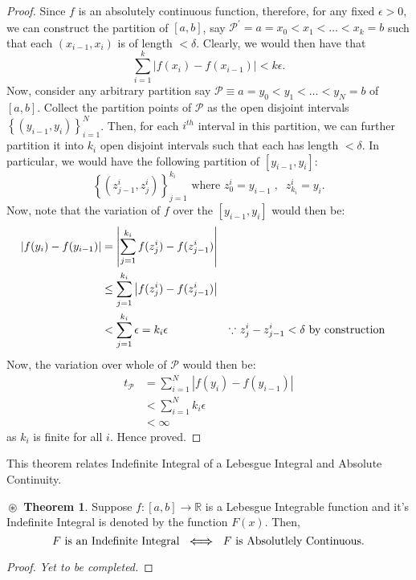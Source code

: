 \documentclass{article}
\theoremstyle{definition}
\newtheorem{theorem}{$\boxed{\boxed{\circledast}}$ Theorem}
\theoremstyle{remark}
\theoremstyle{definition}
\theoremstyle{definition}
\theoremstyle{definition}
\newcommand{\abs}[1]{\left \vert #1\right \vert}
\newcommand{\R}{\mathbb{R}}
\begin{document}
\begin{proof}
	 Since $ f $ is an absolutely continuous function, therefore, for any fixed $ \epsilon > 0 $, we can construct the partition of $ [a,b] $, say $ \mathcal{P}^{\prime} = a = x_0 < x_1 <\dots< x_k = b$ such that each $ (x_{i-1},x_i) $ is of length $ < \delta $. Clearly, we would then have that
	 \[\sum_{i=1}^{k}\abs{f(x_i) - f(x_{i-1})} < k\epsilon.\]
	 Now, consider any arbitrary partition say $ \mathcal{P} \equiv a = y_0 < y_1 < \dots< y_N = b $ of $ [a,b] $. Collect the partition points of $ \mathcal{P} $ as the open disjoint intervals $ \left \{(y_{i-1}, y_i)\right \}_{i=1}^{N}$. Then, for each $ i^{th} $ interval in this partition, we can further partition it into $ k_i $ open disjoint intervals such that each has length $ < \delta $. In particular, we would have the following partition of $ [y_{i-1},y_i] $:
	 \[\left \{(z_{j-1}^{i}, z_{j}^{i})\right \}_{j=1}^{k_i}\text{ where }z_0^{i} = y_{i-1}\;,\;\;z^{i}_{k_i} = y_i.\]
	 Now, note that the variation of $ f $ over the $ [y_{i-1},y_i] $ would then be:
	 \begin{align*}
	 	\abs{f(y_i) - f(y_{i-1})} &= \abs{\sum_{j=1}^{k_i} f(z_{j}^{i}) - f(z_{j-1}^{i})}\\
	 	&\le \sum_{j=1}^{k_i} \abs{f(z_{j}^{i}) - f(z_{j-1}^{i})}\\
	 	&< \sum_{j=1}^{k_i} \epsilon = k_i \epsilon&&\text{$ \because $ $ z_j^{i} - z_{j-1}^{i} < \delta$ by construction}
	 \end{align*}
 Now, the variation over whole of $ \mathcal{P} $ would then be:
 \begin{align*}
 	t_{\mathcal{P}} &= \sum_{i=1}^{N} \abs{f(y_i) - f(y_{i-1})} \\
 	&< \sum_{i=1}^{N} k_i \epsilon\\
 	&< \infty
 \end{align*}
as $ k_i $ is finite for all $ i $. Hence proved.
\end{proof}
\hrulefill

This theorem relates Indefinite Integral of a Lebesgue Integral and Absolute Continuity.
\begin{theorem}
	Suppose $ f : [a,b] \longrightarrow \R$ is a Lebesgue Integrable function and it's Indefinite Integral is denoted by the function $ F(x) $. Then, 
	\[\text{$ F $ is an Indefinite Integral }\bm{\iff}\text{ $ F $ is Absolutlely Continuous.}\] 
\end{theorem}
\begin{proof}
	\emph{Yet to be completed.}
\end{proof}
\hrulefill
\newpage
\end{document}

